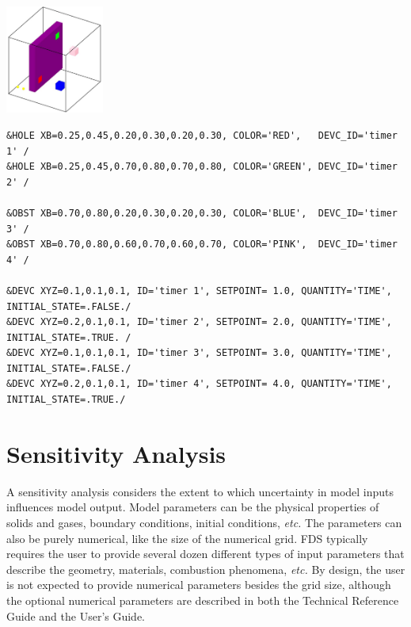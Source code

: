 \documentclass[11pt]{book}
\begin{document}
\vspace{0.2in}
\tiny
\noindent
\begin{minipage}{1.4in}
\includegraphics[height=1.4in]{FIGURES/create_remove}
\end{minipage}
\hfill
\begin{minipage}{5.5in}
\begin{verbatim}
&HOLE XB=0.25,0.45,0.20,0.30,0.20,0.30, COLOR='RED',   DEVC_ID='timer 1' /
&HOLE XB=0.25,0.45,0.70,0.80,0.70,0.80, COLOR='GREEN', DEVC_ID='timer 2' /

&OBST XB=0.70,0.80,0.20,0.30,0.20,0.30, COLOR='BLUE',  DEVC_ID='timer 3' /
&OBST XB=0.70,0.80,0.60,0.70,0.60,0.70, COLOR='PINK',  DEVC_ID='timer 4' /

&DEVC XYZ=0.1,0.1,0.1, ID='timer 1', SETPOINT= 1.0, QUANTITY='TIME', INITIAL_STATE=.FALSE./
&DEVC XYZ=0.2,0.1,0.1, ID='timer 2', SETPOINT= 2.0, QUANTITY='TIME', INITIAL_STATE=.TRUE. /
&DEVC XYZ=0.1,0.1,0.1, ID='timer 3', SETPOINT= 3.0, QUANTITY='TIME', INITIAL_STATE=.FALSE./
&DEVC XYZ=0.2,0.1,0.1, ID='timer 4', SETPOINT= 4.0, QUANTITY='TIME', INITIAL_STATE=.TRUE./
\end{verbatim}
\end{minipage}
\normalsize








\chapter{Sensitivity Analysis}

A sensitivity  analysis considers the  extent to which  uncertainty in
model  inputs influences  model output.  Model parameters  can  be the
physical properties of solids  and gases, boundary conditions, initial
conditions, {\em  etc.} The parameters  can also be  purely numerical,
like the size  of the numerical grid. FDS  typically requires the user
to  provide several  dozen different  types of  input  parameters that
describe the geometry, materials,  combustion phenomena, {\em etc.} By
design,  the user  is  not expected  to  provide numerical  parameters
besides the grid size,  although the optional numerical parameters are
described in both the Technical Reference Guide and the User's Guide.
\end{document}
